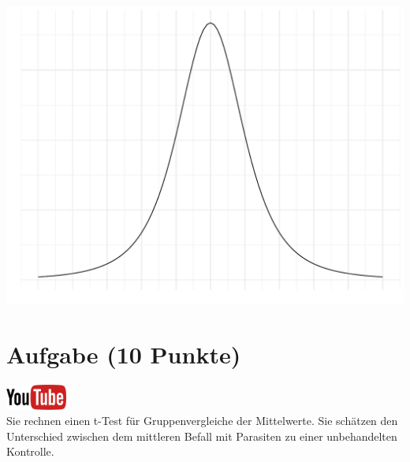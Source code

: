 \documentclass[a4paper, 9pt]{scrartcl}\usepackage[]{graphicx}\usepackage[]{xcolor}
\makeatletter
\def\maxwidth{ %
  \ifdim\Gin@nat@width>\linewidth
    \linewidth
  \else
    \Gin@nat@width
  \fi
}
\makeatother
\begin{document}
{\centering \includegraphics[width=\maxwidth]{img/statistisches-testen-3-1} 

}


 
\clearpage

\section{Aufgabe \hfill (10 Punkte)}

\hfill\href{https://youtu.be/CN_O4fYPbhs}{\includegraphics[width =
  2cm]{img/youtube}}\\[1Ex]



Sie rechnen einen t-Test f{\"u}r Gruppenvergleiche der Mittelwerte. Sie
sch{\"a}tzen den Unterschied zwischen dem mittleren Befall mit Parasiten zu einer unbehandelten
Kontrolle.
\end{document}
